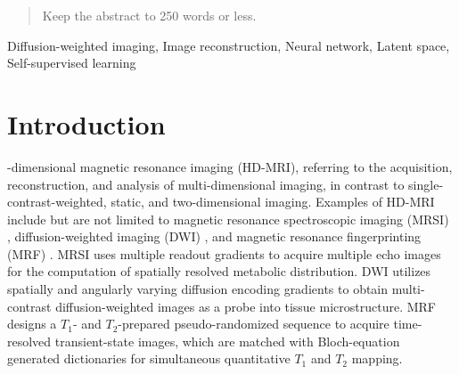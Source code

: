 \documentclass[journal,twoside,web]{ieeecolor}
\begin{document}
	\begin{abstract}
		Keep the abstract to 250 words or less.
	\end{abstract}

	\begin{IEEEkeywords}
	Diffusion-weighted imaging, Image reconstruction, Neural network, Latent space, Self-supervised learning
	\end{IEEEkeywords}

	\section{Introduction}
	\label{SEC:INTRO}
	-dimensional magnetic resonance imaging (HD-MRI),
	referring to the acquisition, reconstruction, and analysis of
	multi-dimensional imaging,
    in contrast to single-contrast-weighted, static, and two-dimensional imaging.
	Examples of HD-MRI include but are not limited to
    magnetic resonance spectroscopic imaging (MRSI) \cite{brown_1982_mrsi},
    diffusion-weighted imaging (DWI) \cite{lebihan_1986_diff},
    and magnetic resonance fingerprinting (MRF) \cite{ma_2013_mrf}.
    MRSI uses multiple readout gradients to acquire multiple echo images
    for the computation of spatially resolved metabolic distribution.
    DWI utilizes spatially and angularly varying
    diffusion encoding gradients
    to obtain multi-contrast diffusion-weighted images
    as a probe into tissue microstructure.
    MRF designs a $T_1$- and $T_2$-prepared pseudo-randomized sequence
    to acquire time-resolved transient-state images,
    which are matched with Bloch-equation generated dictionaries \cite{doneva_2010_moba}
	for simultaneous quantitative $T_1$ and $T_2$ mapping.
\end{document}
